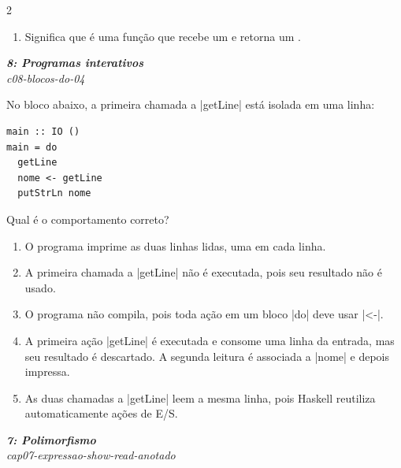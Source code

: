 \documentclass[a4paper,10pt,brazil]{article}
\begin{document}
\begin{multicols}{2}
\begin{enumerate}
  \item Significa que  é uma função que recebe um  e retorna um .


\end{enumerate}

\begin{flushright}
  \footnotesize
  \textit{\textbf{8: Programas interativos}}\\
  \textit{c08-blocos-do-04}\\

\end{flushright}
No bloco abaixo, a primeira chamada a \haskellinline|getLine| está isolada em uma linha:

\begin{verbatim}
main :: IO ()
main = do
  getLine
  nome <- getLine
  putStrLn nome
\end{verbatim}

Qual é o comportamento correto?

\begin{enumerate}
  \item O programa imprime as duas linhas lidas, uma em cada linha.

  \item A primeira chamada a \haskellinline|getLine| não é executada, pois seu resultado não é usado.

  \item O programa não compila, pois toda ação em um bloco \haskellinline|do| deve usar \haskellinline|<-|.

  \item A primeira ação \haskellinline|getLine| é executada e consome uma linha da entrada, mas seu resultado é descartado. A segunda leitura é associada a \haskellinline|nome| e depois impressa.

  \item As duas chamadas a \haskellinline|getLine| leem a mesma linha, pois Haskell reutiliza automaticamente ações de E/S.


\end{enumerate}

\begin{flushright}
  \footnotesize
  \textit{\textbf{7: Polimorfismo}}\\
  \textit{cap07-expressao-show-read-anotado}\\


\end{flushright}
\end{multicols}
\end{document}
